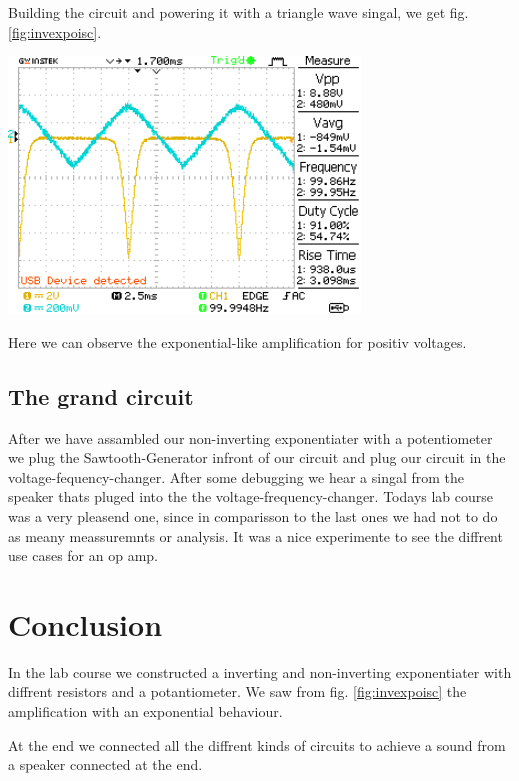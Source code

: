 \documentclass[a4paper,10pt]{article}
\newenvironment{Figure}
        {\par\medskip\noindent\minipage{\linewidth}}
        {\endminipage\par\medskip} %
\numberwithin{equation}{section}
\begin{document}
\begin{multicols}{2}
  Building the circuit and powering it with a triangle wave singal, we get fig. \ref{fig:invexpoisc}.
	\begin{Figure}
		\centering
    \includegraphics[width=0.7\textwidth]{../data/DS0000.png}
    \label{fig:invexpoisc}
	\end{Figure}
  Here we can observe the exponential-like amplification for positiv voltages.


  \subsection{The grand circuit}
  After we have assambled our non-inverting exponentiater with a potentiometer we plug the Sawtooth-Generator infront of our circuit and plug our circuit in the voltage-fequency-changer. After some debugging we hear a singal from the speaker thats pluged into the the voltage-frequency-changer. Todays lab course was a very pleasend one, since in comparisson to the last ones we had not to do as meany meassuremnts or analysis. It was a nice experimente to see the diffrent use cases for an op amp.
  \section{Conclusion}
  In the lab course we constructed a inverting and non-inverting exponentiater with diffrent resistors and a potantiometer. We saw from fig. \ref{fig:invexpoisc} the amplification with an exponential behaviour.

  At the end we connected all the diffrent kinds of circuits to achieve a sound from a speaker connected at the end. 


\end{multicols}

\clearpage
\listoffigures
\listoftables



\end{document}
